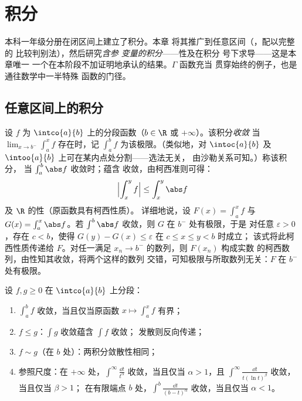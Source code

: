 \chapter{积分}\label{ch:b2:integration}

本科一年级分册在闭区间上建立了积分。本章
将其推广到任意区间（，配以完整的
比较判别法），然后研究\emph{含参
变量的积分}——性及在积分
号下求导——这是本章唯一
一个在本阶段不加证明地承认的结果。$\Gamma$ 函数充当
贯穿始终的例子，也是通往数学中一半特殊
函数的门径。

\section{任意区间上的积分}

\begin{definition}\label{def:b2:integration:improper}
设 $f$ 为 $\intco{a}{b}$ 上的分段函数（$b \in \R$ 或
$+\infty$）。该积分\emph{收敛}
当 $\lim_{x \to b^-} \int_a^x f$ 存在时，记
$\int_a^b f$ 为该极限。（类似地，对 $\intoc{a}{b}$ 及
$\intoo{a}{b}$ 上可在某内点处分割——选法无关，
由沙勒关系可知。）称该积分\emph{}，
当 $\int_a^b \abs f$ 收敛时；蕴含
收敛，由柯西准则可得：
\[
\Bigl| \int_x^{y} f \Bigr| \leq \int_x^{y} \abs f
\]
及 $\R$ 的性（原函数具有柯西性质）。
详细地说，设 $F(x) = \int_a^x f$ 与 $G(x) = \int_a^x \abs
f$。若 $\int^b\abs f$ 收敛，则 $G$ 在 $b^-$ 处有极限，于是
对任意 $\varepsilon > 0$，存在 $c < b$，使得 $G(y) - G(x)
\leq \varepsilon$ 在 $c \leq x \leq y < b$ 时成立；
该式将此柯西性质传递给 $F$。对任一满足 $x_n
\to b^-$ 的数列，则 $F(x_n)$ 构成实数
的柯西数列，由性知其收敛，将两个这样的数列
交错，可知极限与所取数列无关：$F$ 在
$b^-$ 处有极限。
\end{definition}

\begin{theorem}[非负比较判别法]\label{thm:b2:integration:comparison}
设 $f, g \geq 0$ 在 $\intco{a}{b}$ 上分段：
\begin{enumerate}
  \item $\int_a^b f$ 收敛，当且仅当原函数 $x \mapsto \int_a^x
        f$ 有界；
  \item $f \leq g$：$\int g$ 收敛蕴含 $\int f$ 收敛；
        发散则反向传递；
  \item $f \sim g$（在 $b$ 处）：两积分敛散性相同；
  \item 参照尺度：在 $+\infty$ 处，$\int^{\infty}
        \frac{\dd t}{t^\alpha}$ 收敛，当且仅当 $\alpha > 1$，且
        $\int^\infty \frac{\dd t}{t(\ln t)^\beta}$ 收敛，当且仅当 $\beta > 1$；
        在有限端点 $b$ 处，$\int^b \frac{\dd t}{(b -
        t)^\alpha}$ 收敛，当且仅当 $\alpha < 1$。
\end{enumerate}
\end{theorem}

